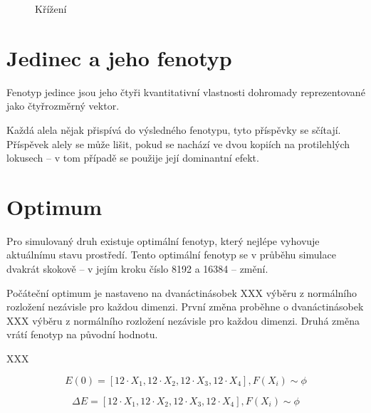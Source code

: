 \begin{figure}

  \caption{Křížení}
\end{figure}



\section{Jedinec a jeho fenotyp}

Fenotyp jedince jsou jeho čtyři kvantitativní vlastnosti dohromady reprezentované jako čtyřrozměrný vektor.

Každá alela nějak přispívá do výsledného fenotypu, tyto příspěvky se sčítají. Příspěvek alely se může lišit, pokud se
nachází ve dvou kopiích na protilehlých lokusech -- v tom případě se použije její dominantní efekt.


\section{Optimum}

Pro simulovaný druh existuje optimální fenotyp, který nejlépe vyhovuje aktuálnímu stavu prostředí.
Tento optimální fenotyp se v průběhu simulace dvakrát skokově -- v jejím kroku číslo 8192 a 16384 -- změní.

Počáteční optimum je nastaveno na dvanáctinásobek XXX výběru z normálního rozložení nezávisle pro každou dimenzi.
První změna proběhne o dvanáctinásobek XXX  výběru z normálního rozložení nezávisle pro každou dimenzi. Druhá změna
vrátí fenotyp na původní hodnotu.

XXX

\begin{equation}
E(0) =  [12{\cdot}X_1, 12{\cdot}X_2, 12{\cdot}X_3, 12{\cdot}X_4], F(X_i) \sim \phi
\end{equation}

\begin{equation}
\Delta{E} = [12{\cdot}X_1, 12{\cdot}X_2, 12{\cdot}X_3, 12{\cdot}X_4], F(X_i) \sim \phi
\end{equation}

